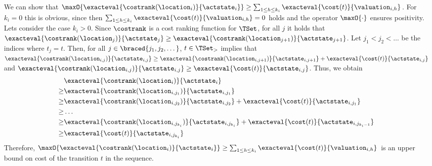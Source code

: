 We can show that $\maxO{\exacteval{\costrank(\location_i)}{\actstate_i}} \geq \sum_{1 \leq h \leq {k_i}} \exacteval{\cost(t)}{\valuation_{i,h}}$.
For $k_i = 0$ this is obvious, since then $\sum_{1 \leq h \leq {k_i}} \exacteval{\cost(t)}{\valuation_{i,h}} = 0$ holds and the operator $\maxO{\cdot}$ ensures positivity.
Lets consider the case $k_i > 0$.
Since $\costrank$ is a cost ranking function for $\TSet$, for all $j$ it holds that $\exacteval{\costrank(\location_j)}{\actstate_j} \geq \exacteval{\costrank(\location_{j+1})}{\actstate_{j+1}}$.
Let $j_1 < j_2 < \dots$ be the indices where $t_j = t$.
Then, for all $j \in \braced{j_1, j_2, \dots}$, $t \in \TSet_>$ implies that $\exacteval{\costrank(\location_{i,j})}{\actstate_{i,j}} \geq \exacteval{\costrank(\location_{i,j+1})}{\actstate_{i,j+1}} + \exacteval{\cost(t)}{\actstate_{i,j}}$ and $\exacteval{\costrank(\location_{i,j})}{\actstate_{i,j}} \geq \exacteval{\cost(t)}{\actstate_{i,j}}$.
Thus, we obtain
\begin{align*}
  & \exacteval{\costrank(\location_i)}{\actstate_i} \\
  \geq & \exacteval{\costrank(\location_{i,j_1})}{\actstate_{i,j_1}} \\
  \geq & \exacteval{\costrank(\location_{i,j_2})}{\actstate_{i,j_2}} + \exacteval{\cost(t)}{\actstate_{i,j_1}} \\
  \geq & \dots \\
  \geq & \exacteval{\costrank(\location_{i,j_{k_i}})}{\actstate_{i,j_{k_i}}} + \exacteval{\cost(t)}{\actstate_{i,j_{k_i-1}}} \\
  \geq & \exacteval{\cost(t)}{\actstate_{i,j_{k_i}}}
\end{align*}
Therefore, $\maxO{\exacteval{\costrank(\location_i)}{\actstate_i}} \geq \sum_{1 \leq h \leq {k_i}} \exacteval{\cost(t)}{\valuation_{i,h}}$ is an upper bound on cost of the transition $t$ in the sequence.

